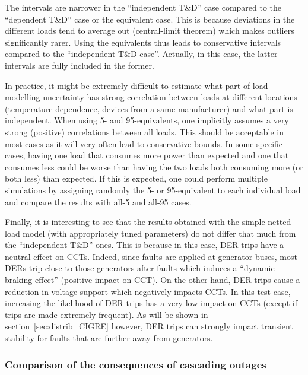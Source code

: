 The intervals are narrower in the ``independent T\&D'' case compared to the ``dependent T\&D'' case or the equivalent case. This is because deviations in the different loads tend to average out (central-limit theorem) which makes outliers significantly rarer. Using the equivalents thus leads to conservative intervals compared to the ``independent T\&D case''. Actually, in this case, the latter intervals are fully included in the former.

In practice, it might be extremely difficult to estimate what part of load modelling uncertainty has strong correlation between loads at different locations (\eg temperature dependence, devices from a same manufacturer) and what part is independent. When using 5- and 95-equivalents, one implicitly assumes a very strong (positive) correlations between all loads. This should be acceptable in most cases as it will very often lead to conservative bounds. In some specific cases, having one load that consumes more power than expected and one that consumes less could be worse than having the two loads both consuming more (or both less) than expected. If this is expected, one could perform multiple simulations by assigning randomly the 5- or 95-equivalent to each individual load and compare the results with all-5 and all-95 cases. %

Finally, it is interesting to see that the results obtained with the simple netted load model (with appropriately tuned parameters) do not differ that much from the ``independent T\&D'' ones. This is because in this case, DER trips have a neutral effect on CCTs. Indeed, since faults are applied at generator buses, most DERs trip close to those generators after faults which induces a ``dynamic braking effect'' (positive impact on CCT). On the other hand, DER trips cause a reduction in voltage support which negatively impacts CCTs. In this test case, increasing the likelihood of DER trips has a very low impact on CCTs (except if trips are made extremely frequent). As will be shown in section~\ref{sec:distrib_CIGRE} however, DER trips can strongly impact transient stability for faults that are further away from generators.



\subsubsection{Comparison of the consequences of cascading outages}
\label{sec:isgt_results_cascading}

